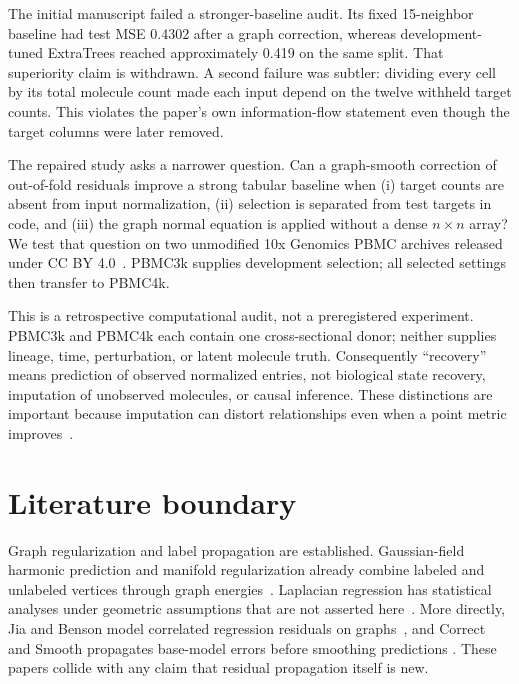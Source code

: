 \documentclass[10pt,letterpaper,twoside]{article}
\begin{document}
The initial manuscript failed a stronger-baseline audit.  Its fixed 15-neighbor
baseline had test MSE 0.4302 after a graph correction, whereas development-tuned
ExtraTrees reached approximately 0.419 on the same split.  That superiority
claim is withdrawn.  A second failure was subtler: dividing every cell by its
total molecule count made each input depend on the twelve withheld target
counts.  This violates the paper's own information-flow statement even though
the target columns were later removed.

The repaired study asks a narrower question.  Can a graph-smooth correction of
out-of-fold residuals improve a strong tabular baseline when (i) target counts
are absent from input normalization, (ii) selection is separated from test
targets in code, and (iii) the graph normal equation is applied without a dense
$n\times n$ array?  We test that question on two unmodified 10x Genomics PBMC
archives released under CC BY 4.0~\cite{tenxPBMC3k,tenxPBMC4k,zheng2017massively}.
PBMC3k supplies development selection; all selected settings then transfer to
PBMC4k.

This is a retrospective computational audit, not a preregistered experiment.
PBMC3k and PBMC4k each contain one cross-sectional donor; neither supplies
lineage, time, perturbation, or latent molecule truth.  Consequently ``recovery''
means prediction of observed normalized entries, not biological state recovery,
imputation of unobserved molecules, or causal inference.  These distinctions
are important because imputation can distort relationships even when a point
metric improves~\cite{andrews2018dropout,svensson2020droplet}.

\section{Literature boundary}

Graph regularization and label propagation are established.  Gaussian-field
harmonic prediction and manifold regularization already combine labeled and
unlabeled vertices through graph energies~\cite{zhu2003gaussian,belkin2006manifold}.
Laplacian regression has statistical analyses under geometric assumptions that
are not asserted here~\cite{green2021minimax}.  More directly, Jia and Benson
model correlated regression residuals on graphs~\cite{jia2020residual}, and
Correct and Smooth propagates base-model errors before smoothing predictions
\cite{huang2021correct}.  These papers collide with any claim that residual
propagation itself is new.
\end{document}
